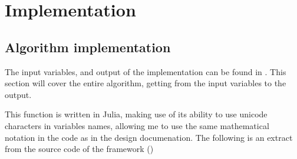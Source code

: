 \chapter{Implementation}

\section{Algorithm implementation}
\label{sec:algorithm_impl}

The input variables, and output of the implementation can be found in . This section will cover the entire algorithm, getting from the input variables to the output.

This function is written in Julia, making use of its ability to use unicode characters in variables names, allowing me to use the same mathematical notation in the code as in the design documenation. The following is an extract from the source code of the framework ()

